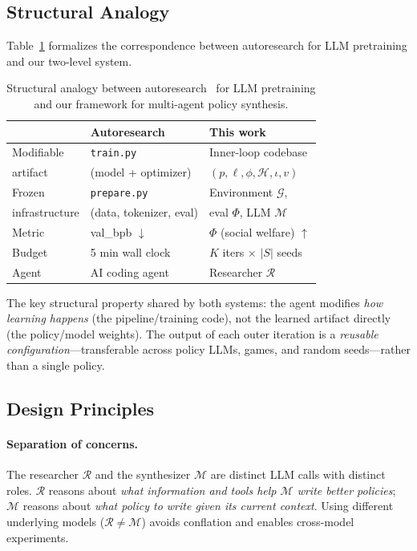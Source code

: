 \documentclass[10pt,twocolumn]{article}
\newcommand{\cR}{\mathcal{R}}
\newcommand{\cM}{\mathcal{M}}
\newcommand{\cG}{\mathcal{G}}
\begin{document}
\subsection{Structural Analogy}

Table~\ref{tab:analogy} formalizes the correspondence between autoresearch for LLM pretraining and our two-level system.

\begin{table}[t]
\caption{Structural analogy between autoresearch~\cite{karpathy2026} for LLM pretraining and our framework for multi-agent policy synthesis.}
\label{tab:analogy}
\centering
\small
\begin{tabular}{@{}lll@{}}
\toprule
 & Autoresearch & This work \\
\midrule
Modifiable & \texttt{train.py} & Inner-loop codebase \\
artifact & (model + optimizer) & $(p, \ell, \phi, \mathcal{H}, \iota, v)$ \\
\addlinespace
Frozen & \texttt{prepare.py} & Environment $\cG$, \\
infrastructure & (data, tokenizer, eval) & eval $\Phi$, LLM $\cM$ \\
\addlinespace
Metric & val\_bpb $\downarrow$ & $\Phi$ (social welfare) $\uparrow$ \\
\addlinespace
Budget & 5 min wall clock & $K$ iters $\times$ $|S|$ seeds \\
\addlinespace
Agent & AI coding agent & Researcher $\cR$ \\
\bottomrule
\end{tabular}
\end{table}

The key structural property shared by both systems: the agent modifies \emph{how learning happens} (the pipeline/training code), not the learned artifact directly (the policy/model weights). The output of each outer iteration is a \emph{reusable configuration}---transferable across policy LLMs, games, and random seeds---rather than a single policy.

\subsection{Design Principles}

\paragraph{Separation of concerns.}
The researcher $\cR$ and the synthesizer $\cM$ are distinct LLM calls with distinct roles. $\cR$ reasons about \emph{what information and tools help $\cM$ write better policies}; $\cM$ reasons about \emph{what policy to write given its current context}. Using different underlying models ($\cR \neq \cM$) avoids conflation and enables cross-model experiments.
\end{document}
